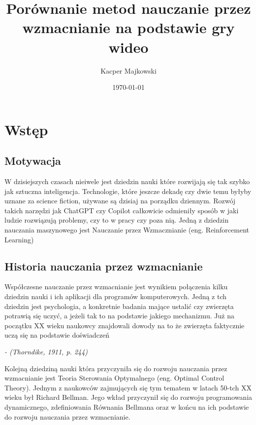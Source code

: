 \documentclass[12pt,a4paper]{article}
\title{Porównanie metod nauczanie przez wzmacnianie na podstawie gry wideo}
\author{Kacper Majkowski}
\date{\today}                      %
\begin{document}
\maketitle

\section{Wstęp}

\subsection{Motywacja}

W dzisiejszych czasach nieiwele jest dziedzin nauki które rozwijają się tak szybko jak sztuczna inteligencja. Technologie, które jeszcze dekadę czy dwie temu byłyby uznane za science fiction, używane są dzisiaj na porządku dziennym. Rozwój takich narzędzi jak ChatGPT czy Copilot całkowicie odmieniły sposób w jaki ludzie rozwiązują problemy, czy to w pracy czy poza nią. Jedną z dziedzin nauczania maszynowego jest Nauczanie przez Wzmacznianie (eng. Reinforcement Learning)

\subsection{Historia nauczania przez wzmacnianie}

Współczesne nauczanie przez wzmacnianie jest wynikiem połączenia kilku dziedzin nauki i ich aplikacji dla programów komputerowych. 
Jedną z tch dziedzin jest psychologia, a konkretnie badania mające ustalić czy zwierzęta potrawią się uczyć, a jeżeli tak to na podstawie jakiego mechanizmu. Już na początku XX wieku naukowcy znajdowali dowody na to że zwierzęta faktycznie uczą się na podstawie doświadczeń

\textit{ - (Thorndike, 1911, p. 244)} \cite{texbook}



Kolejną dziedziną nauki która przyczyniła się do rozwoju nauczania przez wzmacnianie jest Teoria Sterowania Optymalnego (eng. Optimal Control Theory). Jednym z naukowców zajmujących się tym tematem w latach 50-tch XX wieku był Richard Bellman. Jego wkład przyczynił się do rozwoju programowania dynamicznego, zdefiniowania Równania Bellmana oraz w końcu na ich podstawie do rozwoju nauczania przez wzmacnianie.
\end{document}
